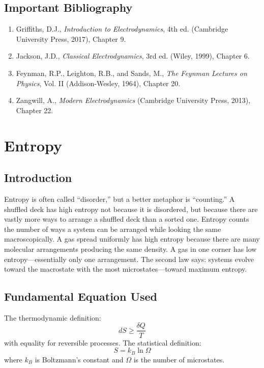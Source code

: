 \documentclass[11pt,openright]{book}
\begin{document}
\section*{Important Bibliography}

\begin{enumerate}
\item Griffiths, D.J., \textit{Introduction to Electrodynamics}, 4th ed. (Cambridge University Press, 2017), Chapter 9.
\item Jackson, J.D., \textit{Classical Electrodynamics}, 3rd ed. (Wiley, 1999), Chapter 6.
\item Feynman, R.P., Leighton, R.B., and Sands, M., \textit{The Feynman Lectures on Physics}, Vol. II (Addison-Wesley, 1964), Chapter 20.
\item Zangwill, A., \textit{Modern Electrodynamics} (Cambridge University Press, 2013), Chapter 22.
\end{enumerate}


\chapter{Entropy}

\section*{Introduction}

Entropy is often called ``disorder,'' but a better metaphor is ``counting.'' A shuffled deck has high entropy not because it is disordered, but because there are vastly more ways to arrange a shuffled deck than a sorted one. Entropy counts the number of ways a system can be arranged while looking the same macroscopically. A gas spread uniformly has high entropy because there are many molecular arrangements producing the same density. A gas in one corner has low entropy---essentially only one arrangement. The second law says: systems evolve toward the macrostate with the most microstates---toward maximum entropy.
\section*{Fundamental Equation Used}

The thermodynamic definition:
\[
dS \geq \frac{\delta Q}{T}
\]
with equality for reversible processes. The statistical definition:
\[
S = k_B \ln \Omega
\]
where $k_B$ is Boltzmann's constant and $\Omega$ is the number of microstates.
\end{document}
